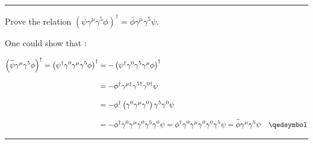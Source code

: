 \noindent\rule{7in}{1.5pt}


\begin{problem}{6.9}
Prove the relation $ \left(\overbar{\psi}\gamma^\mu\gamma^5\phi\right)^\dagger=\overbar{\phi}\gamma^\mu\gamma^5\psi$.
\end{problem}
\begin{solution}
One could show that :

\begin{align*}
    \left(\overbar{\psi}\gamma^\mu\gamma^5\phi\right)^\dagger = \left( \psi^\dagger \gamma^0 \gamma^\mu \gamma^5 \phi \right)^\dagger &= -  \left( \psi^\dagger \gamma^0  \gamma^5 \gamma^\mu \phi \right)^\dagger \\[0.12in]
    &= - \phi^\dagger \gamma^{\mu\dagger} \gamma^{5\dagger} \gamma^{0\dagger}  \psi \\[0.12in]
    &=  - \phi^\dagger \left(\gamma^0 \gamma^{\mu} \gamma^0\right) \gamma^5 \gamma^0  \psi \\[0.12in]
    &=  - \phi^\dagger \gamma^0    \gamma^\mu \gamma^0  \gamma^5 \gamma^0    \psi  = \phi^\dagger \gamma^0    \gamma^\mu \gamma^0  \gamma^0  \gamma^5   \psi =\overbar{\phi}\gamma^\mu\gamma^5\psi \qed 
\end{align*}
\end{solution}

\noindent\rule{7in}{1.5pt}


